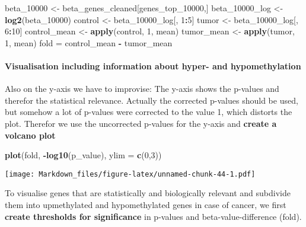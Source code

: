 \documentclass[]{article}
\newenvironment{Shaded}{\begin{snugshade}}{\end{snugshade}}
\newcommand{\KeywordTok}[1]{\textcolor[rgb]{0.13,0.29,0.53}{\textbf{#1}}}
\newcommand{\DataTypeTok}[1]{\textcolor[rgb]{0.13,0.29,0.53}{#1}}
\newcommand{\DecValTok}[1]{\textcolor[rgb]{0.00,0.00,0.81}{#1}}
\newcommand{\StringTok}[1]{\textcolor[rgb]{0.31,0.60,0.02}{#1}}
\newcommand{\OperatorTok}[1]{\textcolor[rgb]{0.81,0.36,0.00}{\textbf{#1}}}
\newcommand{\NormalTok}[1]{#1}
\let\oldparagraph\paragraph
\renewcommand{\paragraph}[1]{\oldparagraph{#1}\mbox{}}
\begin{document}
\begin{Shaded}
\begin{Highlighting}[]
\NormalTok{beta_}\DecValTok{10000}\NormalTok{ <-}\StringTok{ }\NormalTok{beta_genes_cleaned[genes_top_}\DecValTok{10000}\NormalTok{,]}
\NormalTok{beta_10000_log <-}\StringTok{ }\KeywordTok{log2}\NormalTok{(beta_}\DecValTok{10000}\NormalTok{)}
\NormalTok{control <-}\StringTok{ }\NormalTok{beta_10000_log[, }\DecValTok{1}\OperatorTok{:}\DecValTok{5}\NormalTok{]}
\NormalTok{tumor <-}\StringTok{ }\NormalTok{beta_10000_log[, }\DecValTok{6}\OperatorTok{:}\DecValTok{10}\NormalTok{]}
\NormalTok{control_mean <-}\StringTok{ }\KeywordTok{apply}\NormalTok{(control, }\DecValTok{1}\NormalTok{, mean)}
\NormalTok{tumor_mean <-}\StringTok{ }\KeywordTok{apply}\NormalTok{(tumor, }\DecValTok{1}\NormalTok{, mean)}
\NormalTok{fold =}\StringTok{ }\NormalTok{control_mean }\OperatorTok{-}\StringTok{ }\NormalTok{tumor_mean}
\end{Highlighting}
\end{Shaded}

\paragraph{Visualisation including information about hyper- and
hypomethylation}\label{visualisation-including-information-about-hyper--and-hypomethylation}

Also on the y-axis we have to improvise: The y-axis shows the p-values
and therefor the statistical relevance. Actually the corrected p-values
should be used, but somehow a lot of p-values were corrected to the
value 1, which distorts the plot. Therefor we use the uncorrected
p-values for the y-axis and \textbf{create a volcano plot}

\begin{Shaded}
\begin{Highlighting}[]
\KeywordTok{plot}\NormalTok{(fold, }\OperatorTok{-}\KeywordTok{log10}\NormalTok{(p_value), }\DataTypeTok{ylim =} \KeywordTok{c}\NormalTok{(}\DecValTok{0}\NormalTok{,}\DecValTok{3}\NormalTok{))}
\end{Highlighting}
\end{Shaded}

\texttt{[image: Markdown\_files/figure-latex/unnamed-chunk-44-1.pdf]}

To visualise genes that are statistically and biologically relevant and
subdivide them into upmethylated and hypomethylated genes in case of
cancer, we first \textbf{create thresholds for significance} in p-values
and beta-value-difference (fold).
\end{document}
